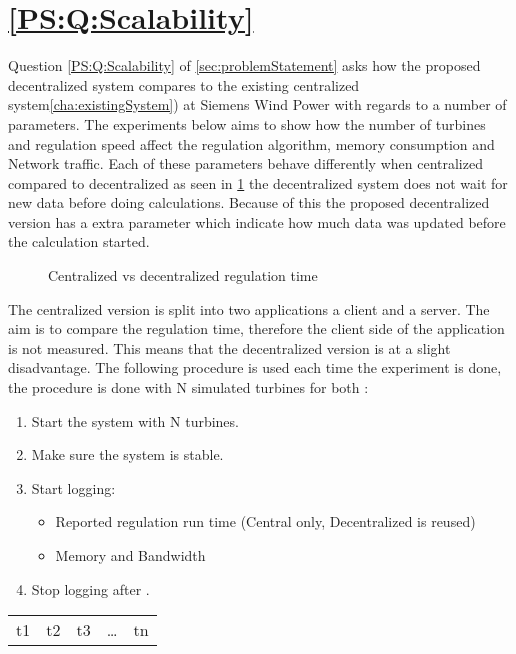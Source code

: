 \section{\ref{PS:Q:Scalability}}
Question \ref{PS:Q:Scalability} of \cref{sec:problemStatement} asks how the proposed decentralized system compares to the existing centralized system\cref{cha:existingSystem}) at Siemens Wind Power with regards to a number of parameters.
The experiments below aims to show how the number of turbines and regulation speed affect the regulation algorithm, memory consumption and Network traffic.
Each of these parameters behave differently when centralized compared to decentralized as seen in \cref{fig:timingCentralVSDecentral} the decentralized system does not wait for new data before doing calculations. Because of this the proposed decentralized version has a extra parameter which indicate how much data was updated before the calculation started.

\begin{figure}[b]
	\centering
	{}
	\newline
	
	\newline
	
	{}
	
	\caption{Centralized vs decentralized regulation time}
	\label{fig:timingCentralVSDecentral}
\end{figure}

	The centralized version is split into two applications a client and a server.
	The aim is to compare the regulation time, therefore the client side of the application is not measured. This means that the decentralized version is at a slight disadvantage.
	The following procedure is used each time the experiment is done, the procedure is done with N simulated turbines for both :

\begin{minipage}{\textwidth}
	\begin{enumerate}
		\item Start the system with N turbines.
		\item Make sure the system is stable.
		\item Start logging:
		\begin{itemize}
			\item Reported regulation run time (Central only, Decentralized is reused)
			\item Memory and Bandwidth
		\end{itemize}
		\item Stop logging after \experiemntRunTime.
		\end{enumerate}
\end{minipage}

\begin{tabular}{ | c | c | c | c | c |}
	\cline{1-3}
	\cline{5-5}
	t1 & t2 & t3 & \dots & tn \\
	\cline{1-3}
	\cline{5-5}
\end{tabular}